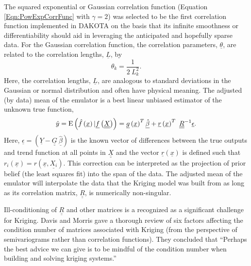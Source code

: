 The squared exponential or Gaussian correlation function (Equation 
\ref{Eqn:PowExpCorrFunc} with $\gamma=2$) was selected to be the 
first correlation function implemented in DAKOTA on the basis that 
its infinite smoothness or differentiability should aid in leveraging 
the anticipated and hopefully sparse data.
For the Gaussian correlation function, the correlation parameters, 
$\underline{\theta}$, are related to the correlation lengths, 
$\underline{L}$, by
\begin{equation}
\theta_k=\frac{1}{2\ L_k^2}.
\end{equation}
Here, the correlation lengths, $\underline{L}$, are analogous to 
standard deviations in the Gaussian or normal distribution and often 
have physical meaning. The adjusted (by data) mean of the emulator is 
a best linear unbiased estimator of the unknown true function,
\begin{equation}
\hat{y}={\rm E}\left(\hat{f}\left(\underline{x}\right)|\underline{f}\left(\underline{\underline{X}}\right)\right)=\underline{g}\left(\underline{x}\right)^T\underline{\hat{\beta}}+\underline{r}\left(\underline{x}\right)^T\ \underline{\underline{R}}^{-1}\underline{\epsilon}.
\label{Eq:KrigMean}
\end{equation}
Here, $\underline{\epsilon}=\left(\underline{Y}-\underline{\underline{G}}\ \underline{\hat{\beta}}\right)$ 
is the known vector of differences between the true outputs and trend 
function at all points in $\underline{\underline{X}}$ and the vector 
$\underline{r}\left(\underline{x}\right)$ is defined such that
$r_i\left(\underline{x}\right)=r\left(\underline{x},\underline{X_i}\right)$.  
This correction can be interpreted as the projection of prior belief 
(the least squares fit) into the span of the data. The adjusted mean 
of the emulator will interpolate the data that the Kriging model was 
built from as long as its correlation matrix, $\underline{\underline{R}}$, 
is numerically non-singular.\newline

Ill-conditioning of $\underline{\underline{R}}$ and other matrices
is a recognized as a significant challenge for Kriging. Davis and 
Morris \cite{Dav97} gave a thorough review of six factors 
affecting the condition number of matrices associated with Kriging
(from the perspective of semivariograms rather than correlation 
functions).  They concluded that 
``Perhaps the best advice we can give is to be mindful of the 
condition number when building and solving kriging systems.''\newline


